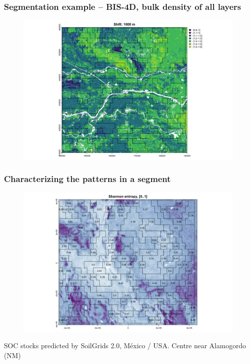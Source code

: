 \documentclass[aspectratio=169, 10pt]{beamer}
\begin{document}
\begin{frame}
  \frametitle{Segmentation example -- BIS-4D, bulk density of all layers}
    \begin{figure}
        \centering        \includegraphics[height=0.7\textheight]{graphics_david/all-files-resolutions-3.png}
      \end{figure}
\end{frame}
      

  \begin{frame}
    \frametitle{Characterizing the patterns in a segment}
    \begin{figure}
        \centering        \includegraphics[height=0.6\textheight]{graphics_david/compute-sg-nm-8M-3.png}
      \end{figure}
      {\footnotesize SOC stocks predicted by SoilGrids 2.0, M\'{e}xico / USA. Centre near Alamogordo (NM)}
  \end{frame}
  
\end{document}
